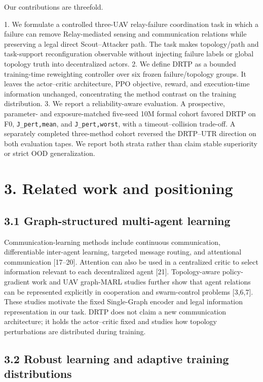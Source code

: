 Our contributions are threefold.

1. We formulate a controlled three-UAV relay-failure coordination task in which a failure can remove Relay-mediated sensing and communication relations while preserving a legal direct Scout--Attacker path. The task makes topology/path and task-support reconfiguration observable without injecting failure labels or global topology truth into decentralized actors.
2. We define DRTP as a bounded training-time reweighting controller over six frozen failure/topology groups. It leaves the actor--critic architecture, PPO objective, reward, and execution-time information unchanged, concentrating the method contrast on the training distribution.
3. We report a reliability-aware evaluation. A prospective, parameter- and exposure-matched five-seed 10M formal cohort favored DRTP on F0, \texttt{J_pert,mean}, and \texttt{J_pert,worst}, with a timeout--collision trade-off. A separately completed three-method cohort reversed the DRTP--UTR direction on both evaluation tapes. We report both strata rather than claim stable superiority or strict OOD generalization.

\section{3. Related work and positioning}

\subsection{3.1 Graph-structured multi-agent learning}

Communication-learning methods include continuous communication, differentiable inter-agent learning, targeted message routing, and attentional communication [17--20]. Attention can also be used in a centralized critic to select information relevant to each decentralized agent [21]. Topology-aware policy-gradient work and UAV graph-MARL studies further show that agent relations can be represented explicitly in cooperation and swarm-control problems [3,6,7]. These studies motivate the fixed Single-Graph encoder and legal information representation in our task. DRTP does not claim a new communication architecture; it holds the actor--critic fixed and studies how topology perturbations are distributed during training.

\subsection{3.2 Robust learning and adaptive training distributions}


